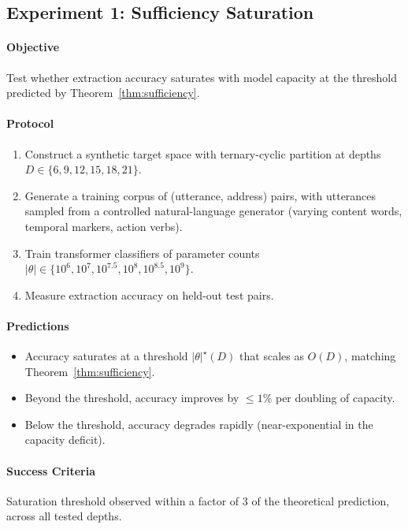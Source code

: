 \documentclass[11pt,twocolumn,a4paper]{article}
\theoremstyle{definition}
\theoremstyle{remark}
\begin{document}
\subsection{Experiment 1: Sufficiency Saturation}

\paragraph{Objective} Test whether extraction accuracy saturates with model capacity at the threshold predicted by Theorem~\ref{thm:sufficiency}.

\paragraph{Protocol}
\begin{enumerate}
    \item Construct a synthetic target space with ternary-cyclic partition at depths $D \in \{6, 9, 12, 15, 18, 21\}$.
    \item Generate a training corpus of (utterance, address) pairs, with utterances sampled from a controlled natural-language generator (varying content words, temporal markers, action verbs).
    \item Train transformer classifiers of parameter counts $|\theta| \in \{10^6, 10^7, 10^{7.5}, 10^8, 10^{8.5}, 10^9\}$.
    \item Measure extraction accuracy on held-out test pairs.
\end{enumerate}

\paragraph{Predictions}
\begin{itemize}
    \item Accuracy saturates at a threshold $|\theta|^\star(D)$ that scales as $O(D)$, matching Theorem~\ref{thm:sufficiency}.
    \item Beyond the threshold, accuracy improves by $\leq 1\%$ per doubling of capacity.
    \item Below the threshold, accuracy degrades rapidly (near-exponential in the capacity deficit).
\end{itemize}

\paragraph{Success Criteria}
Saturation threshold observed within a factor of 3 of the theoretical prediction, across all tested depths.
\end{document}

